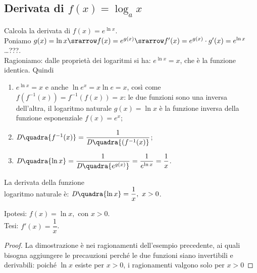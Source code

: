 \subsection{Derivata di $f(x)=\log_a x$}
\label{}
\begin{esempio}
  Calcola la derivata di $f(x)=e^{\ln x}$.\\
  Poniamo $g(x)=\ln x\srarrow f(x)=e^{g(x)}\srarrow f'(x)=e^{g(x)}\cdot g'(x)=
  e^{\ln x}$ \dots ???.\\
  Ragioniamo: dalle proprietà
  dei logaritmi si ha: $e^{\ln x} =x$, che è la funzione identica. Quindi
  \begin{enumerate}[noitemsep]
    \item $e^{\ln x} =x$ e anche $\ln e^x= x\ln e=x$, così come 
    $f(f^{-1}(x))=f^{-1}(f(x))=x$: le due funzioni sono una inversa 
dell'altra,
    il logaritmo naturale $g(x)=\ln x$ è la funzione inversa della
    funzione esponenziale $f(x)=e^x$;
    \item 
$\mathit{D}\quadra{f^{-1}(x)}=\dfrac{1}{\mathit{D}\quadra{(f^{-1}(x)}}$;
    \item $\mathit{D}\quadra{\ln x}=\dfrac{1}{\mathit{D}\quadra{e^{g(x)}}}
    =\dfrac{1}{e^{\ln x}}=\dfrac{1}{x}$.
  \end{enumerate}
\end{esempio}

\begin{inaccessibleblock}
  \begin{minipage}[]{.55\textwidth}
   \begin{center} \esplog \end{center}
 \end{minipage} 
  \hfill
 \begin{minipage}[]{.42\textwidth}
 \begin{teorema}
  La derivata della funzione \\
  logaritmo naturale è: $\mathit{D}\quadra{\ln x}=
  \dfrac{1}{x},\ x>0$.
\end{teorema}
\noindent Ipotesi: $f(x)=\ln x, \mbox{ con } x>0$.\\
\noindent Tesi: $f'(x)=\dfrac{1}{x}$.
\begin{proof}
La dimostrazione è nei ragionamenti dell'esempio precedente, ai quali 
bisogna 
aggiungere le precauzioni perché le due funzioni siano invertibili e 
derivabili: 
poiché $\ln x$ esiste per $x>0$, i ragionamenti valgono solo per $x>0$
\end{proof} 
 \end{minipage}
\end{inaccessibleblock}
\label{}
\\

